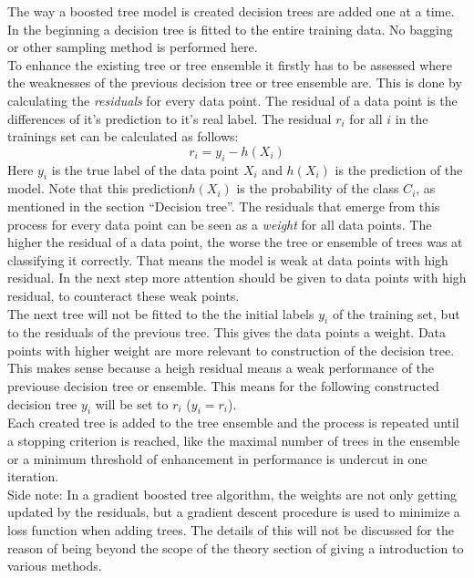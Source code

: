 The way a boosted tree model is created decision trees are added one at a time.
\\
In the beginning a decision tree is fitted to the entire training data. No bagging or other sampling method is performed here. 
\\
To enhance the existing tree or tree ensemble it firstly has to be assessed where the weaknesses of the previous decision tree or tree ensemble are. This is done by calculating the \emph{residuals} for every data point. The residual of a data point is the differences of it's prediction to it's real label. The residual $r_i$ for all $i$ in the trainings set can be calculated as follows:
 \begin{equation} \label{eq:20}
r_i=y_i-h(X_i)
\end{equation}
Here $y_i$ is the true label of the data point $X_i$ and $h(X_i)$ is the prediction of the model. Note that this prediction$h(X_i)$ is the probability of the class $C_i$, as mentioned in the section ``Decision tree''. The residuals that emerge from this process for every data point can be seen as a \emph{weight} for all data points. The higher the residual of a data point, the worse the tree or ensemble of trees was at classifying it correctly. That means the model is weak at data points with high residual. In the next step more attention should be given to data points with high residual, to counteract these weak points.
\\
The next tree will not be fitted to the the initial labels $y_i$ of the training set, but to the residuals of the previous tree. This gives the data points a weight. Data points with higher weight are more relevant to construction of the decision tree. This makes sense because a heigh residual means a weak performance of the previouse decision tree or ensemble. This means for the following constructed decision tree $y_i$ will be set to $r_i$ ($y_i=r_i$).
\\
Each created tree is added to the tree ensemble and the process is repeated until a stopping criterion is reached, like the maximal number of trees in the ensemble or a minimum threshold of enhancement in performance is undercut in one iteration.
\\
Side note: In a gradient boosted tree algorithm, the weights are not only getting updated by the residuals, but a gradient descent procedure is used to minimize a loss function when adding trees. The details of this will not be discussed for the reason of being beyond the scope of the theory section of giving a introduction to various methods.
\\

